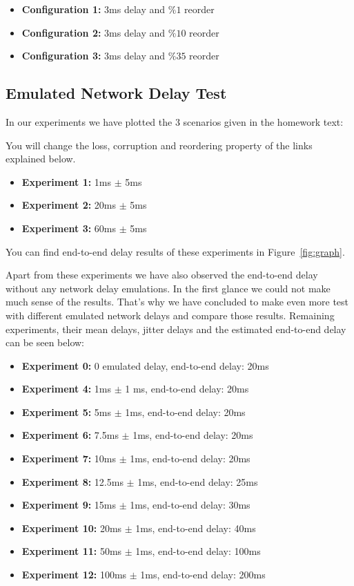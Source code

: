 \documentclass[conference]{IEEEtran}
\begin{document}
\begin{itemize}
    \item \textbf{Configuration 1:} 3ms delay and $\%1$ reorder
    \item \textbf{Configuration 2:} 3ms delay and $\%10$ reorder
    \item \textbf{Configuration 3:} 3ms delay and $\%35$ reorder
\end{itemize}

\subsection{Emulated Network Delay Test}\label{AA}

In our experiments we have plotted the 3 scenarios given in the homework text:

 You will change the loss, corruption and reordering property of the links explained below. 

\begin{itemize}
    \item \textbf{Experiment 1:} 1ms $\pm$ 5ms
    \item \textbf{Experiment 2:} 20ms $\pm$ 5ms
    \item \textbf{Experiment 3:} 60ms $\pm$ 5ms
\end{itemize}
You can find end-to-end delay results of these experiments in Figure~\ref{fig:graph}.

Apart from these experiments we have also observed the end-to-end delay without any network delay emulations. In the first glance we could not make much sense of the results. That's why we have concluded to  make even more test with different emulated network delays and compare those results. Remaining experiments, their mean delays, jitter delays and the estimated end-to-end delay can be seen below:

\begin{itemize}
    \item \textbf{Experiment 0:} 0 emulated delay, end-to-end delay: 20ms
    \item \textbf{Experiment 4:} 1ms $\pm$ 1 ms, end-to-end delay: 20ms
    \item \textbf{Experiment 5:} 5ms $\pm$ 1ms, end-to-end delay: 20ms
    \item \textbf{Experiment 6:} 7.5ms $\pm$ 1ms, end-to-end delay: 20ms
    \item \textbf{Experiment 7:} 10ms $\pm$ 1ms, end-to-end delay: 20ms
    \item \textbf{Experiment 8:} 12.5ms $\pm$ 1ms, end-to-end delay: 25ms
    \item \textbf{Experiment 9:} 15ms $\pm$ 1ms, end-to-end delay: 30ms
    \item \textbf{Experiment 10:} 20ms $\pm$ 1ms, end-to-end delay: 40ms
    \item \textbf{Experiment 11:} 50ms $\pm$ 1ms, end-to-end delay: 100ms
    \item \textbf{Experiment 12:} 100ms $\pm$ 1ms, end-to-end delay: 200ms
\end{itemize}
\end{document}
